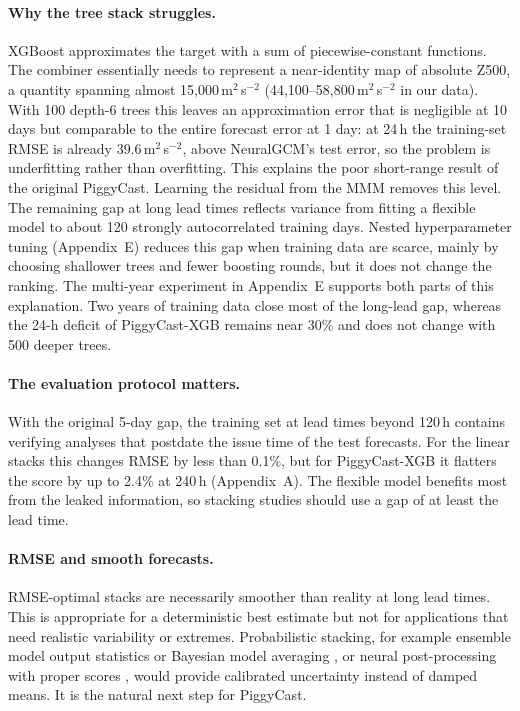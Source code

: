 \documentclass[twocol]{ametsocV6.1}
\newcommand{\units}{m$^{2}$\,s$^{-2}$}
\newcommand{\Zfive}{Z500}
\newcommand{\PCXGB}{PiggyCast-XGB}
\begin{document}
\paragraph{Why the tree stack struggles.} XGBoost approximates the target with a sum of piecewise-constant functions. The combiner essentially needs to represent a near-identity map of absolute \Zfive{}, a quantity spanning almost 15{,}000\,\units{} (44{,}100--58{,}800\,\units{} in our data). With 100 depth-6 trees this leaves an approximation error that is negligible at 10 days but comparable to the entire forecast error at 1 day: at 24\,h the training-set RMSE is already 39.6\,\units{}, above NeuralGCM's test error, so the problem is underfitting rather than overfitting. This explains the poor short-range result of the original PiggyCast. Learning the residual from the MMM removes this level. The remaining gap at long lead times reflects variance from fitting a flexible model to about 120 strongly autocorrelated training days. Nested hyperparameter tuning (Appendix~E) reduces this gap when training data are scarce, mainly by choosing shallower trees and fewer boosting rounds, but it does not change the ranking. The multi-year experiment in Appendix~E supports both parts of this explanation. Two years of training data close most of the long-lead gap, whereas the 24-h deficit of \PCXGB{} remains near 30\% and does not change with 500 deeper trees.

\paragraph{The evaluation protocol matters.} With the original 5-day gap, the training set at lead times beyond 120\,h contains verifying analyses that postdate the issue time of the test forecasts. For the linear stacks this changes RMSE by less than 0.1\%, but for \PCXGB{} it flatters the score by up to 2.4\% at 240\,h (Appendix~A). The flexible model benefits most from the leaked information, so stacking studies should use a gap of at least the lead time.

\paragraph{RMSE and smooth forecasts.} RMSE-optimal stacks are necessarily smoother than reality at long lead times. This is appropriate for a deterministic best estimate but not for applications that need realistic variability or extremes. Probabilistic stacking, for example ensemble model output statistics or Bayesian model averaging \citep{gneiting2005emos, raftery2005bma, vannitsem2021postprocessing}, or neural post-processing with proper scores \citep{rasp2018postprocessing}, would provide calibrated uncertainty instead of damped means. It is the natural next step for PiggyCast.
\end{document}
